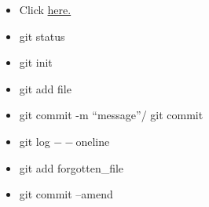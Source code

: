 \documentclass[landscape,a0paper,fontscale=0.285]{baposter} %
\newcommand{\compresslist}{ %
\setlength{\itemsep}{1pt}
\setlength{\parskip}{0pt}
\setlength{\parsep}{0pt}
}
\begin{document}
{\begin{poster}
{\begin{itemize}
\end{itemize}


\colorbox[HTML]{A3C1AD}{}
\begin{itemize}
\item Click \href{https://docs.github.com/en/authentication/connecting-to-github-with-ssh/checking-for-existing-ssh-keys}{here.}
\end{itemize}

\colorbox[HTML]{A3C1AD}{}
\begin{itemize}\compresslist
\item git status
\item git init 


\end{itemize}


\colorbox[HTML]{A3C1AD}{}
\begin{itemize}\compresslist
\item git add file

\item git commit -m “message”/ git commit 



\end{itemize}


\colorbox[HTML]{A3C1AD}{}
\begin{itemize}\compresslist
\item git log ${--}$oneline


\end{itemize}


\colorbox[HTML]{A3C1AD}{}
\begin{itemize}\compresslist
\item git add forgotten\_file
\item git commit –amend




\end{itemize}}
\end{poster}}
\end{document}

